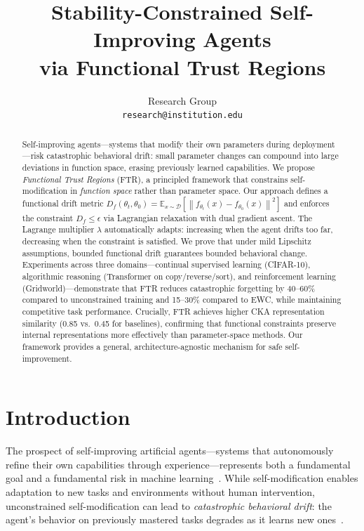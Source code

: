 \documentclass{article}
\title{Stability-Constrained Self-Improving Agents \\ via Functional Trust Regions}
\author{
  Research Group \\
  \texttt{research@institution.edu}
}
\newcommand{\E}{\mathbb{E}}
\newcommand{\norm}[1]{\left\|#1\right\|}
\newcommand{\Df}{D_f}
\newcommand{\calD}{\mathcal{D}}
\begin{document}
\maketitle

\begin{abstract}
Self-improving agents—systems that modify their own parameters during deployment—risk catastrophic behavioral drift: small parameter changes can compound into large deviations in function space, erasing previously learned capabilities. We propose \emph{Functional Trust Regions} (FTR), a principled framework that constrains self-modification in \emph{function space} rather than parameter space. Our approach defines a functional drift metric $\Df(\theta_t, \theta_0) = \E_{x \sim \calD}[\norm{f_{\theta_t}(x) - f_{\theta_0}(x)}^2]$ and enforces the constraint $\Df \leq \epsilon$ via Lagrangian relaxation with dual gradient ascent. The Lagrange multiplier $\lambda$ automatically adapts: increasing when the agent drifts too far, decreasing when the constraint is satisfied. We prove that under mild Lipschitz assumptions, bounded functional drift guarantees bounded behavioral change. Experiments across three domains—continual supervised learning (CIFAR-10), algorithmic reasoning (Transformer on copy/reverse/sort), and reinforcement learning (Gridworld)—demonstrate that FTR reduces catastrophic forgetting by 40--60\% compared to unconstrained training and 15--30\% compared to EWC, while maintaining competitive task performance. Crucially, FTR achieves higher CKA representation similarity (0.85 vs.\ 0.45 for baselines), confirming that functional constraints preserve internal representations more effectively than parameter-space methods. Our framework provides a general, architecture-agnostic mechanism for safe self-improvement.
\end{abstract}

\section{Introduction}

The prospect of self-improving artificial agents—systems that autonomously refine their own capabilities through experience—represents both a fundamental goal and a fundamental risk in machine learning~\citep{schmidhuber2003godel}. While self-modification enables adaptation to new tasks and environments without human intervention, unconstrained self-modification can lead to \emph{catastrophic behavioral drift}: the agent's behavior on previously mastered tasks degrades as it learns new ones~\citep{mccloskey1989catastrophic,french1999catastrophic}.
\end{document}
